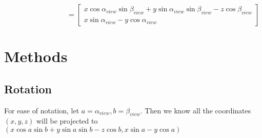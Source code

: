 \documentclass[]{article}
\begin{document}
\begin{equation}
\hspace{100pt}=\left[ 
\begin{array}{c}
x\cos \alpha_{view} \sin \beta_{view} + y\sin \alpha_{view} \sin \beta_{view} -z\cos \beta_{view}  \\ 
x\sin \alpha_{view} -y\cos \alpha_{view} 
\end{array}%
\right]
\end{equation} \label{eq3}



\pagebreak
\section{Methods}

\subsection{Rotation}

For ease of notation, let $a=\alpha_{view},b=\beta_{view}$. Then we know all the coordinates $(x,y,z)$ will be projected to $(x\cos a \sin b + y\sin a \sin b-z\cos b, x \sin a - y \cos a)$
\end{document}
